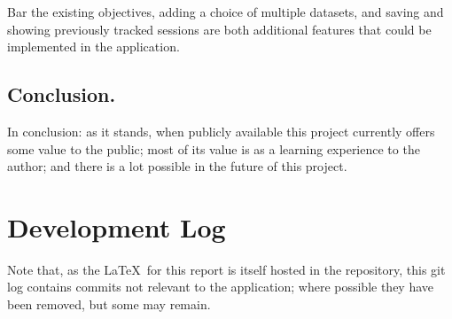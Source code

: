 \documentclass[11pt, a4paper, notitlepage]{report}
\begin{document}
Bar the existing objectives, adding a choice of multiple datasets, and saving and showing previously tracked sessions are both additional features that could be implemented in the application.

\section{Conclusion.}
In conclusion: as it stands, when publicly available this project currently offers some value to the public; most of its value is as a learning experience to the author; and there is a lot possible in the future of this project.

\appendix
\chapter{Development Log}\label{app:GitLog}
Note that, as the \LaTeX\ for this report is itself hosted in the repository, this git log contains commits not relevant to the application; where possible they have been removed, but some may remain. 
\end{document}
